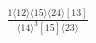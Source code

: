 \documentclass[varwidth, border=5pt]{standalone}
\begin{document}
\begin{my}
$\begin{gathered}
\scriptscriptstyle\frac{1⟨12⟩⟨15⟩⟨24⟩[13]}{⟨14⟩^3[15]⟨23⟩}
\end{gathered}$
\end{my}
\end{document}
